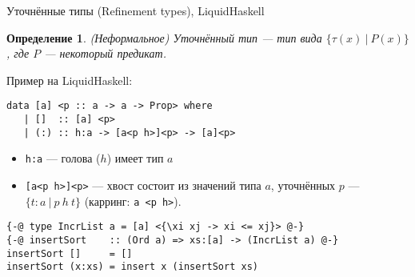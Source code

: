 \documentclass[aspectratio=169]{beamer}
\newtheorem{dfn}{Определение}[section]
\begin{document}
\begin{frame}[fragile]{Уточнённые типы (Refinement types), LiquidHaskell}
\begin{dfn}(Неформальное) Уточнённый тип --- тип вида $\{\tau(x)\ |\ P(x)\}$, где $P$ --- некоторый предикат.\end{dfn}

Пример на LiquidHaskell:
\begin{verbatim}
data [a] <p :: a -> a -> Prop> where
   | []  :: [a] <p>
   | (:) :: h:a -> [a<p h>]<p> -> [a]<p>
\end{verbatim}
\begin{itemize}
\item \verb!h:a! --- голова ($h$) имеет тип $a$\\
\item \verb![a<p h>]<p>! --- хвост состоит из значений типа $a$, уточнённых $p$ --- $\{ t : a\ |\ p\ h\ t\}$ (карринг: \verb!a <p h>!).
\end{itemize}

\begin{verbatim}
{-@ type IncrList a = [a] <{\xi xj -> xi <= xj}> @-}
{-@ insertSort    :: (Ord a) => xs:[a] -> (IncrList a) @-}
insertSort []     = []
insertSort (x:xs) = insert x (insertSort xs) 
\end{verbatim}
\end{frame}
\end{document}
